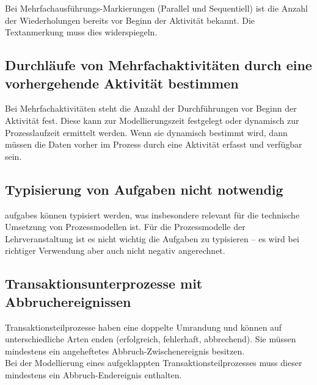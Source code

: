 \documentclass[12pt,report]{snetTeaching}
\begin{document}
Bei Mehrfachausführungs-Markierungen (Parallel und Sequentiell) ist die Anzahl der Wiederholungen bereits vor Beginn der Aktivität bekannt. Die Textanmerkung muss dies widerspiegeln.

\begin{Rahmen}
	\hfill
\end{Rahmen}

\clearpage
\subsection{Durchläufe von Mehrfachaktivitäten durch eine vorhergehende Aktivität bestimmen}

Bei Mehrfachaktivitäten steht die Anzahl der Durchführungen vor Beginn der Aktivität fest. Diese kann zur Modellierungszeit festgelegt oder dynamisch zur Prozesslaufzeit ermittelt werden. Wenn sie dynamisch bestimmt wird, dann müssen die Daten vorher im Prozess durch eine Aktivität erfasst und verfügbar sein.


\begin{Rahmen}
\end{Rahmen}

\subsection{Typisierung von Aufgaben nicht notwendig}

\Glspl{aufgabe} können typisiert werden, was insbesondere relevant für die technische Umsetzung von Prozessmodellen ist. Für die Prozessmodelle der Lehrveranstaltung \lvname{} ist es nicht wichtig die Aufgaben zu typisieren -- es wird bei richtiger Verwendung aber auch nicht negativ angerechnet.

\begin{Rahmen}
	\hfill
\end{Rahmen}

\clearpage

\subsection{Transaktionsunterprozesse mit Abbruchereignissen}

Transaktionsteilprozesse haben eine doppelte Umrandung und können auf unterschiedliche Arten enden (erfolgreich, fehlerhaft, abbrechend). Sie müssen mindestens ein angeheftetes Abbruch-Zwischenereignis besitzen.\\
Bei der Modellierung eines aufgeklappten Transaktionsteilprozesses muss dieser mindestens ein Abbruch-Endereignis enthalten.
\end{document}
